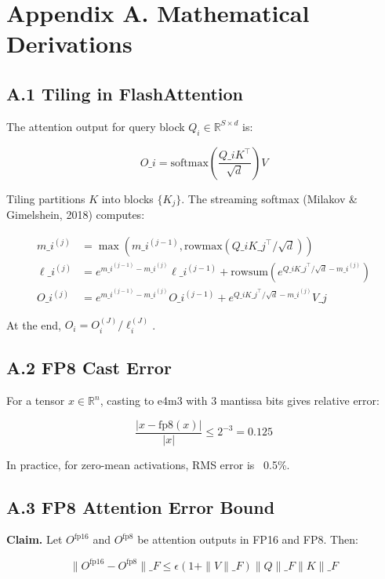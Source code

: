 
\section{Appendix A. Mathematical Derivations}

\subsection{A.1 Tiling in FlashAttention}

The attention output for query block $Q_i \in \mathbb{R}^{S \times d}$ is:

\[
O\_i = \text{softmax}\!\left(\frac{Q\_i K^\top}{\sqrt{d}}\right) V
\tag{A.1}
\]

Tiling partitions $K$ into blocks $\{K_j\}$. The streaming softmax (Milakov 
\& Gimelshein, 2018) computes:

\[
\begin{aligned}
m\_i^{(j)} &= \max(m\_i^{(j-1)}, \text{rowmax}(Q\_i K\_j^\top / \sqrt{d})) \\
\ell\_i^{(j)} &= e^{m\_i^{(j-1)} - m\_i^{(j)}} \ell\_i^{(j-1)} 
              + \text{rowsum}(e^{Q\_i K\_j^\top / \sqrt{d} - m\_i^{(j)}}) \\
O\_i^{(j)} &= e^{m\_i^{(j-1)} - m\_i^{(j)}} O\_i^{(j-1)} 
          + e^{Q\_i K\_j^\top / \sqrt{d} - m\_i^{(j)}} V\_j
\end{aligned}
\tag{A.2}
\]

At the end, $O_i = O_i^{(J)} / \ell_i^{(J)}$.

\subsection{A.2 FP8 Cast Error}

For a tensor $x \in \mathbb{R}^n$, casting to e4m3 with 3 mantissa bits gives 
relative error:

\[
\frac{|x - \text{fp8}(x)|}{|x|} \leq 2^{-3} = 0.125
\tag{A.3}
\]

In practice, for zero-mean activations, RMS error is ~0.5\%.

\subsection{A.3 FP8 Attention Error Bound}

\textbf{Claim.} Let $O^\text{fp16}$ and $O^\text{fp8}$ be attention outputs in 
FP16 and FP8. Then:

\[
\|O^\text{fp16} - O^\text{fp8}\|\_F \leq \epsilon (1 + \|V\|\_F) \|Q\|\_F \|K\|\_F
\tag{A.4}
\]

